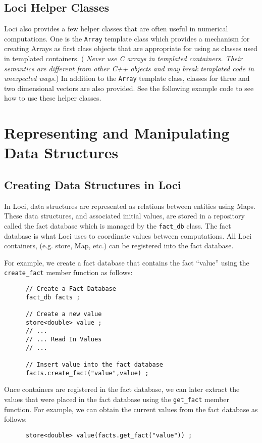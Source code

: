 \documentclass[10pt,epsf]{book}
\begin{document}


\section{Loci Helper Classes}

Loci also provides a few helper classes that are often useful in
numerical computations.  One is the {\tt Array} template class which provides a
mechanism for creating Arrays as first class objects that are
appropriate for using as classes used in templated containers. ({\it
Never use C arrays in templated containers.  Their semantics are
different from other C++ objects and may break templated code in
unexpected ways.})  In addition to the {\tt Array} template class,
classes for three and two dimensional vectors are also provided.  See
the following example code to see how to use these helper classes.



\chapter{Representing and Manipulating Data Structures}
\section{Creating Data Structures in Loci}

In Loci, data structures are represented as relations between entities
using Maps.  These data structures, and associated initial values, are
stored in a repository called the fact database which is managed by
the {\tt fact\_db} class.  The fact database is what Loci uses to
coordinate values between computations.  All Loci containers, (e.g.
store, Map, etc.) can be registered into the fact database.

For example, we create a fact database that contains the fact ``value'' using the {\tt create\_fact} member function as follows:
\begin{verbatim}
      // Create a Fact Database
      fact_db facts ;

      // Create a new value
      store<double> value ;
      // ...
      // ... Read In Values
      // ...
   
      // Insert value into the fact database
      facts.create_fact("value",value) ;
\end{verbatim}

Once containers are registered in the fact database, we can later
extract the values that were placed in the fact database using the 
{\tt get\_fact} member function.  For example, we can obtain the
current values from the fact database as follows:
\begin{verbatim}
      store<double> value(facts.get_fact("value")) ;
\end{verbatim}
\end{document}
